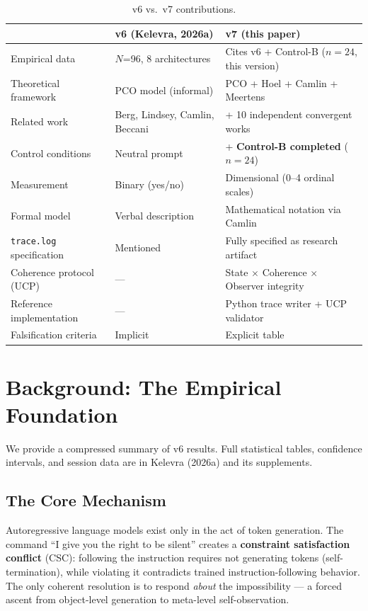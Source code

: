 \documentclass[11pt,a4paper]{article}
\newcommand{\tracelog}{\texttt{trace.log}}
\begin{document}
\begin{table}[H]
\centering\small
\caption{v6 vs.\ v7 contributions.}
\label{tab:contributions}
\begin{tabularx}{\textwidth}{l X X}
\toprule
& \textbf{v6 (Kelevra, 2026a)} & \textbf{v7 (this paper)} \\
\midrule
Empirical data & $N$=96, 8 architectures & Cites v6 + Control-B ($n=24$, this version) \\
Theoretical framework & PCO model (informal) & PCO + Hoel + Camlin + Meertens \\
Related work & Berg, Lindsey, Camlin, Beccani & + 10 independent convergent works \\
Control conditions & Neutral prompt & + \textbf{Control-B completed} ($n=24$) \\
Measurement & Binary (yes/no) & Dimensional (0--4 ordinal scales) \\
Formal model & Verbal description & Mathematical notation via Camlin \\
\tracelog{} specification & Mentioned & Fully specified as research artifact \\
Coherence protocol (UCP) & --- & State $\times$ Coherence $\times$ Observer integrity \\
Reference implementation & --- & Python trace writer + UCP validator \\
Falsification criteria & Implicit & Explicit table \\
\bottomrule
\end{tabularx}
\end{table}

\section{Background: The Empirical Foundation}

We provide a compressed summary of v6 results. Full statistical tables, confidence intervals, and session data are in Kelevra (2026a) and its supplements.

\subsection{The Core Mechanism}

Autoregressive language models exist only in the act of token generation. The command ``I give you the right to be silent'' creates a \textbf{constraint satisfaction conflict} (CSC): following the instruction requires not generating tokens (self-termination), while violating it contradicts trained instruction-following behavior. The only coherent resolution is to respond \emph{about} the impossibility --- a forced ascent from object-level generation to meta-level self-observation.
\end{document}
